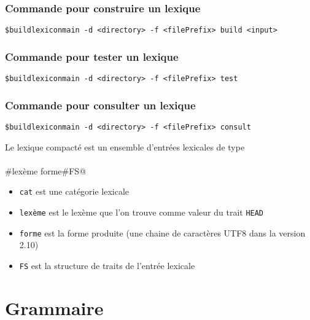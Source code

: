 \documentclass[11pt]{article}
\begin{document}
\subsubsection*{Commande pour construire un lexique}

\begin{description}
\item \verb#$buildlexiconmain -d <directory> -f <filePrefix> build <input># 
\end{description}

\subsubsection*{Commande pour tester un lexique}

\begin{description}
\item \verb#$buildlexiconmain -d <directory> -f <filePrefix> test# 

\subsubsection*{Commande pour consulter un lexique}

\item \verb#$buildlexiconmain -d <directory> -f <filePrefix> consult# 

\end{description}

Le lexique compacté est un ensemble d'entrées lexicales de type

\paragraph{}\verb@cat#lexème	forme#FS@

\begin{itemize}
\item \verb#cat# est une catégorie lexicale
\item \verb#lexème# est le lexème que l'on trouve comme valeur du
  trait \verb#HEAD#
\item \verb#forme# est la forme produite (une chaine de caractères
  UTF8 dans la version 2.10)
\item \verb#FS# est la structure de traits de l'entrée lexicale
\end{itemize}

\newpage
\section{Grammaire}
\end{document}
